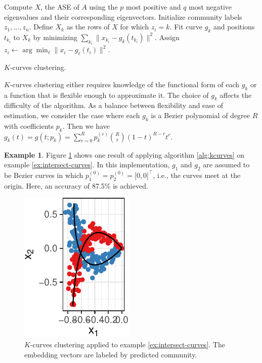\documentclass[
  12pt,
]{article}
\theoremstyle{definition}
\theoremstyle{definition}
\newtheorem{example}{Example}[section]
\theoremstyle{definition}
\theoremstyle{definition}
\theoremstyle{remark}
\begin{document}
\begin{algorithm}[h]
\label{alg:kcurves}
\DontPrintSemicolon
\SetAlgoLined
{}
Compute $X$, the ASE of $A$ using the $p$ most positive and $q$ most negative eigenvalues and their corresponding eigenvectors.\;
Initialize community labels $z_1, ..., z_n$.\;
 {
 {
Define $X_k$ as the rows of $X$ for which $z_i = k$.\;
Fit curve $g_k$ and positions $t_{k_i}$ to $X_k$ by minimizing $\sum_{k_i} \|x_{k_i} - g_k(t_{k_i})\|^2$.\;
}
 {
Assign $z_i \leftarrow \arg\min_\ell \|x_i - g_\ell(t_i)\|^2$.\;
}
}
\caption{$K$-curves clustering.}
\end{algorithm}

\(K\)-curves clustering either requires knowledge of the functional form of each \(g_k\) or a function that is flexible enough to approximate it.
The choice of \(g_k\) affects the difficulty of the algorithm.
As a balance between flexibility and ease of estimation, we consider the case where each \(g_k\) is a Bezier polynomial of degree \(R\) with coefficients \(p_k\).
Then we have \(g_k(t) = g(t; p_k) = \sum_{r=0}^R p_k^{(r)} \binom{R}{r} (1-t)^{R-r} t^r\).

\begin{example}
\label{ex:intersect-curves-fit}
Figure \ref{fig:intersect-curves-2} shows one result of applying algorithm \ref{alg:kcurves} on example \ref{ex:intersect-curves}. 
In this implementation, $g_1$ and $g_2$ are assumed to be Bezier curves in which $p_1^{(0)} = p_2^{(0)} = \Big[ 0, 0 \Big]^\top$, i.e., the curves meet at the origin. 
Here, an accuracy of 87.5\% is achieved. 

\begin{figure}[H]

{\centering \includegraphics{draft_files/figure-latex/intersect-curves-2-1} 

}

\caption{$K$-curves clustering applied to example \ref{ex:intersect-curves}. The embedding vectors are labeled by predicted community.}\label{fig:intersect-curves-2}
\end{figure}
\end{example}
\end{document}
